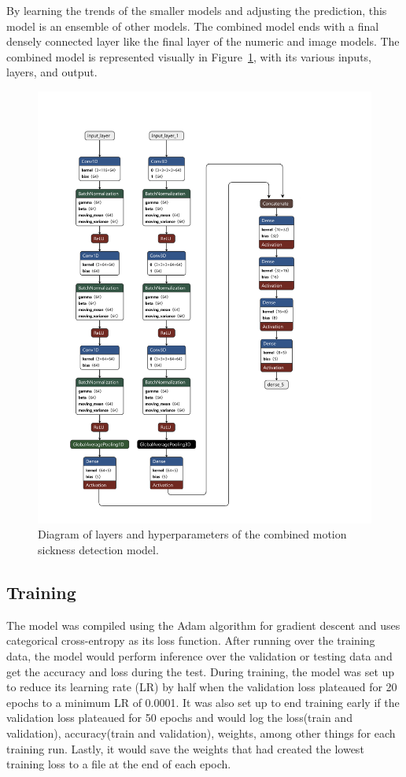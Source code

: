 By learning the trends of the smaller models and adjusting the prediction, this model is an ensemble of other models.
The combined model ends with a final densely connected layer like the final layer of the numeric and image models.
The combined model is represented visually in Figure~\ref{fig:model diagram}, with its various inputs, layers, and output.

\pagebreak
\begin{figure}[h!]
    \includegraphics[height=0.7\paperheight]{Figures/model_diag}
    \centering
    \caption{Diagram of layers and hyperparameters of the combined motion sickness detection model.}
    \label{fig:model diagram}
\end{figure}
\pagebreak

\subsection{Training}
\label{subsec:training}

The model was compiled using the Adam algorithm for gradient descent and uses categorical cross-entropy as its loss function.
After running over the training data, the model would perform inference over the validation or testing data and get the accuracy and loss during the test.
During training, the model was set up to reduce its learning rate (LR) by half when the validation loss plateaued for 20 epochs to a minimum LR of 0.0001.
It was also set up to end training early if the validation loss plateaued for 50 epochs and would log the loss(train and validation), accuracy(train and validation), weights, among other things for each training run.
Lastly, it would save the weights that had created the lowest training loss to a file at the end of each epoch.

